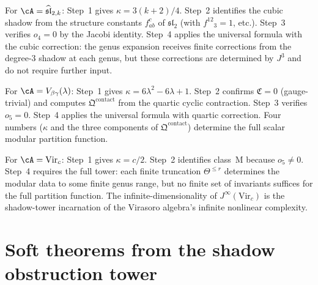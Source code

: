 \begin{proposition}
For $\cA = \widehat{\mathfrak{sl}}_{2,k}$: Step~1 gives $\kappa = 3(k+2)/4$.
Step~2 identifies the cubic shadow from the structure constants $f^c_{ab}$ of
$\mathfrak{sl}_2$ (with $f^{12}{}_3 = 1$, etc.). Step~3 verifies $o_4 = 0$
by the Jacobi identity. Step~4 applies the universal formula with the cubic
correction: the genus expansion receives finite corrections from the degree-$3$ shadow
at each genus, but these corrections are determined by $J^3$ and do not require
further input.
\end{proposition}

\begin{proposition}
For $\cA = V_{\beta\gamma}(\lambda)$: Step~1 gives $\kappa = 6\lambda^2 - 6\lambda + 1$.
Step~2 confirms $\mathfrak{C} = 0$ (gauge-trivial) and computes
$\mathfrak{Q}^{\mathrm{contact}}$ from the quartic cyclic contraction. Step~3
verifies $o_5 = 0$. Step~4 applies the universal formula with quartic correction.
Four numbers ($\kappa$ and the three components of $\mathfrak{Q}^{\mathrm{contact}}$) determine
the full scalar modular partition function.
\end{proposition}

\begin{proposition}
For $\cA = \mathrm{Vir}_c$: Step~1 gives $\kappa = c/2$. Step~2 identifies class~M
because $o_5 \neq 0$. Step~4 requires the full tower: each finite truncation
$\Theta^{\leq r}$ determines the modular data to some finite genus range, but
no finite set of invariants suffices for the full partition function. The
infinite-dimensionality of $J^\infty(\mathrm{Vir}_c)$ is the shadow-tower
incarnation of the Virasoro algebra's infinite nonlinear complexity.
\end{proposition}



\section{Soft theorems from the shadow obstruction tower}

